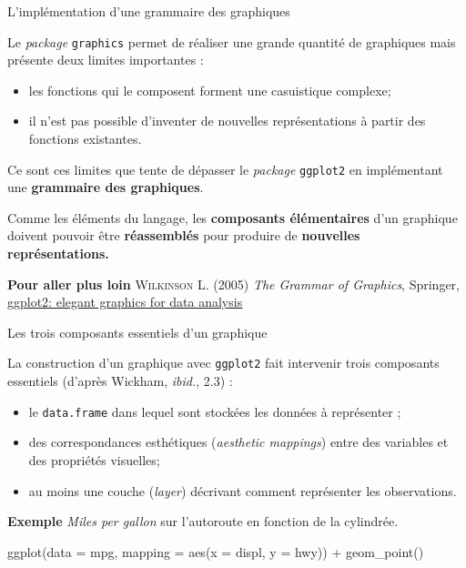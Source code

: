 \documentclass[12pt,ignorenonframetext,]{beamer}
\newenvironment{Shaded}{}{}
\newcommand{\KeywordTok}[1]{\textcolor[rgb]{0.00,0.00,1.00}{#1}}
\newcommand{\DataTypeTok}[1]{#1}
\newcommand{\StringTok}[1]{\textcolor[rgb]{0.00,0.50,0.50}{#1}}
\newcommand{\OperatorTok}[1]{#1}
\newcommand{\NormalTok}[1]{#1}
\providecommand{\tightlist}{%
  \setlength{\itemsep}{0pt}\setlength{\parskip}{0pt}}
\renewenvironment{Shaded}{\begin{snugshade}}{\end{snugshade}}
\newcommand{\intertitre}[1]{\textcolor{redInsee}{\textbf{#1}}}
\begin{document}
\begin{frame}[fragile]{\large L'implémentation d'une grammaire des
graphiques}

Le \emph{package} \texttt{graphics} permet de réaliser une grande
quantité de graphiques mais présente deux limites importantes :

\begin{itemize}
\tightlist
\item
  les fonctions qui le composent forment une casuistique complexe;
\item
  il n'est pas possible d'inventer de nouvelles représentations à partir
  des fonctions existantes.
\end{itemize}

\pause Ce sont ces limites que tente de dépasser le \emph{package}
\texttt{ggplot2} en implémentant une \textbf{grammaire des graphiques}.

Comme les éléments du langage, les \textbf{composants élémentaires} d'un
graphique doivent pouvoir être \textbf{réassemblés} pour produire de
\textbf{nouvelles représentations.}

\pause 

\intertitre{Pour aller plus loin} \textsc{Wilkinson L.} (2005)
\textit{The Grammar of Graphics}, Springer,
\href{https://github.com/hadley/ggplot2-book}{\underline{ggplot2: elegant graphics for data analysis}}

\end{frame}

\begin{frame}[fragile]{\large Les trois composants essentiels d'un
graphique}

La construction d'un graphique avec \texttt{ggplot2} fait intervenir
trois composants essentiels (d'après Wickham, \emph{ibid.}, 2.3) :

\begin{itemize}
\tightlist
\item
  le \texttt{data.frame} dans lequel sont stockées les données à
  représenter ;
\item
  des correspondances esthétiques (\emph{aesthetic mappings}) entre des
  variables et des propriétés visuelles;
\item
  au moins une couche (\emph{layer}) décrivant comment représenter les
  observations.
\end{itemize}

\pause 

\intertitre{Exemple} \emph{Miles per gallon} sur l'autoroute en fonction
de la cylindrée.

\center \small 

\begin{Shaded}
\begin{Highlighting}[]
\KeywordTok{ggplot}\NormalTok{(}\DataTypeTok{data =}\NormalTok{ mpg, }\DataTypeTok{mapping =} \KeywordTok{aes}\NormalTok{(}\DataTypeTok{x =}\NormalTok{ displ, }\DataTypeTok{y =}\NormalTok{ hwy)) }\OperatorTok{+}
\StringTok{  }\KeywordTok{geom_point}\NormalTok{()}
\end{Highlighting}
\end{Shaded}

\end{frame}
\end{document}
